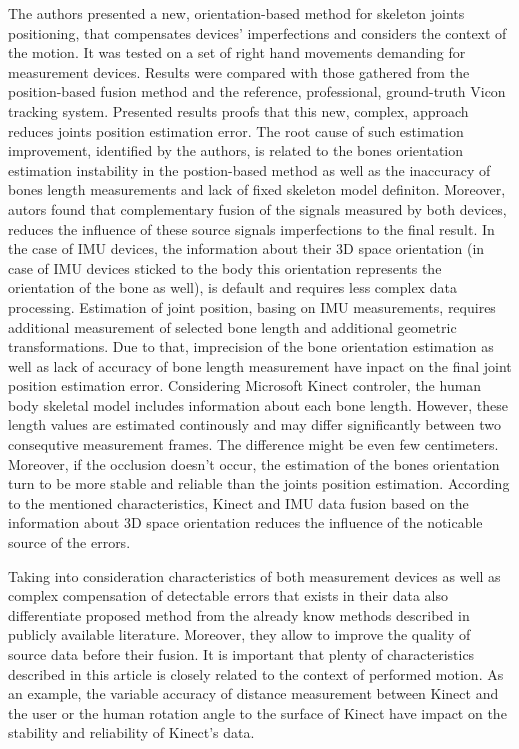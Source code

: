\documentclass[sensors,article,submit,moreauthors,pdftex,10pt,a4paper]{mdpi}
\begin{document}
	The authors presented a new, orientation-based method for skeleton joints positioning, that compensates devices' imperfections and considers the context of the motion. It was tested on a set of right hand movements demanding for measurement devices. Results were compared with those gathered from the position-based fusion method and the reference, professional, ground-truth Vicon tracking system. Presented results proofs that this new, complex, approach reduces joints position estimation error. The root cause of such estimation improvement, identified by the authors, is related to the bones orientation estimation instability in the postion-based method as well as the inaccuracy of bones length measurements and lack of fixed skeleton model definiton. Moreover, autors found that complementary fusion of the signals measured by both devices, reduces the influence of these source signals imperfections to the final result.
	In the case of IMU devices, the information about their 3D space orientation (in case of IMU devices sticked to the body this orientation represents the orientation of the bone as well), is default and requires less complex data processing. Estimation of joint position, basing on IMU measurements, requires additional measurement of selected bone length and additional geometric transformations. Due to that, imprecision of the bone orientation estimation as well as lack of accuracy of bone length measurement have inpact on the final joint position estimation error.
	Considering Microsoft Kinect controler, the human body skeletal model includes information about each bone length. However, these length values are estimated continously and may differ significantly between two consequtive measurement frames. The difference might be even few centimeters. Moreover, if the occlusion doesn't occur, the estimation of the bones orientation turn to be more stable and reliable than the joints position estimation. 
	According to the mentioned characteristics, Kinect and IMU data fusion based on the information about 3D space orientation reduces the influence of the noticable source of the errors.
	
	Taking into consideration characteristics of both measurement devices as well as complex compensation of detectable errors that exists in their data also differentiate proposed method from the already know methods described in publicly available literature. Moreover, they allow to improve the quality of source data before their fusion. It is important that plenty of characteristics described in this article is closely related to the context of performed motion. As an example, the variable accuracy of distance measurement between Kinect and the user or the human rotation angle to the surface of Kinect have impact on the stability and reliability of Kinect's data.
	
\end{document}
